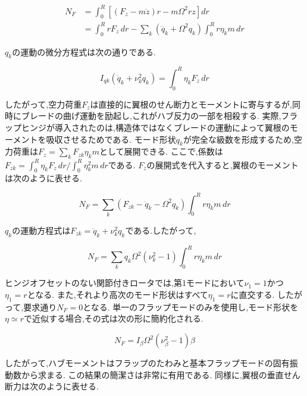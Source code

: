     \begin{align}
    N_F &= \int_0^R \left[(F_z - m \ddot{z}) r - m \Omega^2 r z \right] dr     \\
        &= \int_0^R r F_z \, dr - \sum_k \left( \ddot{q}_k + \Omega^2 q_k \right) \int_0^R r \eta_k m \, dr  \label{nf3}
    \end{align}

    $q_k$の運動の微分方程式は次の通りである.

    \begin{equation}
    I_{qk} \left( \ddot{q}_k + \nu_k^2 q_k \right) = \int_0^R \eta_k F_z \, dr  \label{Iqk}
    \end{equation}


    したがって,空力荷重$F_z$は直接的に翼根のせん断力とモーメントに寄与するが,同時にブレードの曲げ運動を励起し,これがハブ反力の一部を相殺する.
    実際,フラップヒンジが導入されたのは,構造体ではなくブレードの運動によって翼根のモーメントを吸収させるためである.
    モード形状$q_k$が完全な級数を形成するため,空力荷重は$F_z = \sum_k F_{zk} \eta_k m$として展開できる.
    ここで,係数は$F_{zk} = \int_0^R \eta_k F_z \, dr / \int_0^R \eta_k^2 m \, dr $である.
    $F_z$の展開式を代入すると,翼根のモーメントは次のように表せる.

    \begin{equation}
    N_F = \sum_k \left( F_{zk} - \ddot{q}_k - \Omega^2 q_k \right) \int_0^R r \eta_k m \, dr     \label{nf4}
    \end{equation}

    $q_k$の運動方程式は$F_{zk} =  \ddot{q}_k +  \nu_{k}^2 q_k  $である.したがって,

    \begin{equation}
    N_F = \sum_k  q_k \Omega^2 \left( \nu_{k}^2 - 1  \right) \int_0^R r \eta_k m \, dr     \label{nf5}
    \end{equation}

    ヒンジオフセットのない関節付きロータでは,第1モードにおいて$\nu_{1} = 1$かつ$\eta_{1} = r$となる.
    また,それより高次のモード形状はすべて$\eta_{1} = r$に直交する.
    したがって,要求通り$N_F = 0$となる.
    単一のフラップモードのみを使用し,モード形状を$\eta \simeq r$で近似する場合,その式は次の形に簡約化される.

    \begin{equation}
    N_F = I_{\beta} \Omega^2 \left( \nu_{\beta}^2 - 1  \right) \beta    \label{nf6}
    \end{equation}

    したがって,ハブモーメントはフラップのたわみと基本フラップモードの固有振動数から求まる.
    この結果の簡潔さは非常に有用である.
    同様に,翼根の垂直せん断力は次のように表せる.

